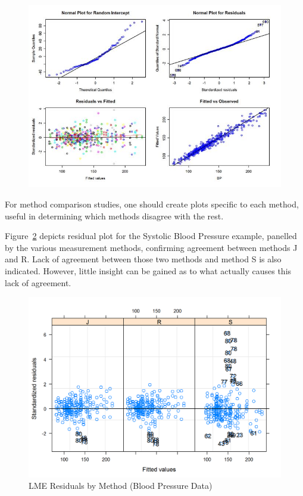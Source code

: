 \documentclass[12pt, a4paper]{report}
\theoremstyle{definition}
\theoremstyle{remark}
\begin{document}
\begin{figure}[h!]
	\centering
	\includegraphics[width=0.9\linewidth]{images/ResidPlot}
	\caption{}
	\label{fig:ResidPlot}
\end{figure}




For method comparison studies, one should create plots specific to each method, useful in determining which methods disagree with the rest.

Figure~\ref{bloodnlme-ResidPlot} depicts residual plot for the Systolic Blood Pressure example, panelled by the various measurement methods, confirming agreement between methods J and R. Lack of agreement between those two methods and method S is also indicated. However, little insight can be gained as to what actually causes this lack of agreement. 
\begin{figure}[h!]
	\centering
	\includegraphics[width=0.8\linewidth]{images/bloodnlme-ResidPlot}
	\caption{LME Residuals by Method (Blood Pressure Data)}
	\label{bloodnlme-ResidPlot}
\end{figure}
\end{document}
